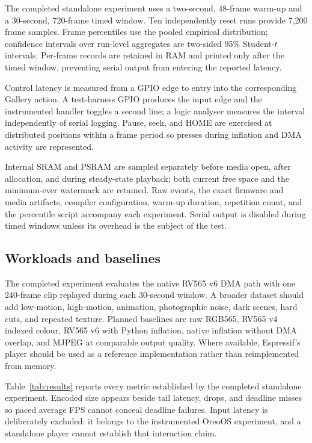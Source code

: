 \documentclass[11pt,twocolumn]{article}
\begin{document}
The completed standalone experiment uses a two-second, 48-frame warm-up and a
30-second, 720-frame timed window.  Ten independently reset runs provide 7,200
frame samples.  Frame percentiles use the pooled empirical distribution;
confidence intervals over run-level aggregates are two-sided 95\% Student-$t$
intervals.  Per-frame records are retained in RAM and printed only after the
timed window, preventing serial output from entering the reported latency.

Control latency is measured from a GPIO edge to entry into the corresponding
Gallery action.  A test-harness GPIO produces the input edge and the
instrumented handler toggles a second line; a logic analyser measures the
interval independently of serial logging.  Pause, seek, and HOME are exercised
at distributed positions within a frame period so presses during inflation and
DMA activity are represented.

Internal SRAM and PSRAM are sampled separately before media open, after
allocation, and during steady-state playback; both current free space and the
minimum-ever watermark are retained.  Raw events, the exact firmware and media
artifacts, compiler configuration, warm-up duration, repetition count, and the
percentile script accompany each experiment.  Serial output is disabled during
timed windows unless its overhead is the subject of the test.

\subsection{Workloads and baselines}

The completed experiment evaluates the native RV565 v6 DMA path with one
240-frame clip replayed during each 30-second window.  A broader dataset should
add low-motion, high-motion, animation, photographic noise, dark scenes, hard
cuts, and repeated texture.  Planned baselines are raw RGB565, RV565 v4 indexed
colour, RV565 v6 with Python inflation, native inflation without DMA overlap,
and MJPEG at comparable output quality.  Where available, Espressif's player
should be used as a reference implementation rather than reimplemented from
memory.

Table~\ref{tab:results} reports every metric established by the completed
standalone experiment.  Encoded size appears beside tail latency, drops, and
deadline misses so paced average FPS cannot conceal deadline failures.  Input
latency is deliberately excluded: it belongs to the instrumented OreoOS
experiment, and a standalone player cannot establish that interaction claim.
\end{document}
